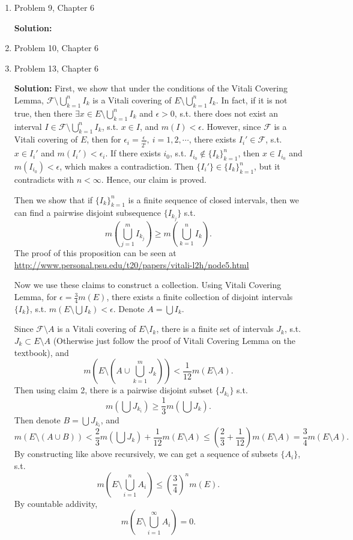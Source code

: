 \documentclass{article}%
\begin{document}
\begin{enumerate}
\item  Problem 9,  Chapter 6 

\smallskip
\textbf{Solution:}
\smallskip



\item  Problem 10, Chapter 6
\item  Problem 13, Chapter 6

\smallskip
\textbf{Solution:}
\smallskip
First, we show that under the conditions of the Vitali Covering Lemma, $\mathcal{F}\setminus \bigcup\limits_{k=1}^n I_k $ is a Vitali covering of $E\setminus \bigcup\limits_{k=1}^n I_k$. In fact, if it is not true, then there $\exists x\in E\setminus\bigcup\limits_{k=1}^n I_k$ and $\epsilon > 0$, s.t. there does not exist an interval $I\in\mathcal{F}\setminus\bigcup\limits_{k=1}^n I_k$, s.t. $x\in I$, and $m(I) < \epsilon$. However, since $\mathcal{F}$ is a Vitali covering of $E$, then for $\epsilon_i = \frac{\epsilon}{2^i}, ~i = 1, 2, \cdots $, there exists $I_i'\in\mathcal{F} $, s.t. $x\in I_i' $ and $m(I_i') < \epsilon_i $. If there exists $i_0 $, s.t. $I_{i_0}\notin \{I_k\}_{k = 1}^{n} $, then $x\in I_{i_0} $ and $m(I_{i_0}) < \epsilon$, which makes a contradiction. Then $\{I_i'\} \in \{I_k\}_{k = 1}^{n}$, but it contradicts with $n < \infty$. Hence, our claim is proved.

Then we show that if $\{I_k\}_{k=1}^{n} $ is a finite sequence of closed intervals, then we can find a pairwise disjoint subsequence $\{I_{k_j}\}$ s.t. 
$$
m(\bigcup_{j = 1}^{m} I_{k_j}) \ge m(\bigcup_{k=1}^{n}I_k).
$$
The proof of this proposition can be seen at \href{http://www.personal.psu.edu/t20/papers/vitali-l2h/node5.html}{http://www.personal.psu.edu/t20/papers/vitali-l2h/node5.html}

Now we use these claims to construct a collection. Using Vitali Covering Lemma, for $\epsilon = \frac{3}{4}m(E)$, there exists a finite collection of disjoint intervals $\{I_k\}$, s.t. $m(E\setminus \bigcup I_k) < \epsilon$. Denote $A = \bigcup I_k $.

Since $\mathcal{F}\setminus A$ is a Vitali covering of $E\setminus I_k $, there is a finite set of intervals $J_k $, s.t. $J_k\subset E\setminus A $ (Otherwise just follow the proof of Vitali Covering Lemma on the textbook), and 
$$
m(E\setminus (A\cup\bigcup_{k=1}^m J_k)) < \frac{1}{12}m(E\setminus A).
$$
Then using claim 2, there is a pairwise disjoint subset $\{J_{k_i}\}$ s.t. 
$$
m(\bigcup J_{k_i}) \ge \frac{1}{3}m(\bigcup J_k).
$$
Then denote $B = \bigcup J_{k_i} $, and 
$$
m(E\setminus (A\cup B)) < \frac{2}{3}m(\bigcup J_k) +\frac{1}{12}m(E\setminus A) \le (\frac{2}{3}+\frac{1}{12})m(E\setminus A) = \frac{3}{4}m(E\setminus A).
$$
By constructing like above recursively, we can get a sequence of subsets $\{A_i\}$, s.t. 
$$
m(E\setminus \bigcup_{i=1}^n A_i) \le (\frac{3}{4})^n m(E).
$$
By countable addivity,
$$
m(E\setminus \bigcup_{i=1}^\infty A_i) = 0.
$$


\end{enumerate}
\end{document}
